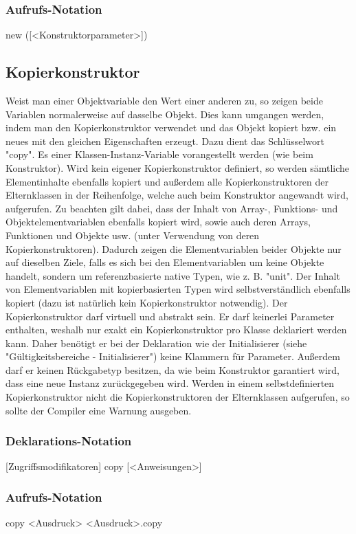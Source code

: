 \subsubsection{Aufrufs-Notation}
new ([<Konstruktorparameter>])

\subsection{Kopierkonstruktor}
Weist man einer Objektvariable den Wert einer anderen zu, so zeigen beide Variablen normalerweise auf dasselbe Objekt.
Dies kann umgangen werden, indem man den Kopierkonstruktor verwendet und das Objekt kopiert bzw. ein neues mit den gleichen
Eigenschaften erzeugt.
Dazu dient das Schlüsselwort "copy". Es einer Klassen-Instanz-Variable vorangestellt werden (wie beim Konstruktor).
Wird kein eigener Kopierkonstruktor definiert, so werden sämtliche Elementinhalte ebenfalls kopiert und außerdem
alle Kopierkonstruktoren der Elternklassen in der Reihenfolge, welche auch beim Konstruktor angewandt wird, aufgerufen.
Zu beachten gilt dabei, dass der Inhalt von Array-, Funktions- und Objektelementvariablen ebenfalls kopiert wird, sowie auch deren
Arrays, Funktionen und Objekte usw. (unter Verwendung von deren Kopierkonstruktoren). Dadurch zeigen die Elementvariablen beider Objekte nur auf
dieselben Ziele, falls es sich bei den Elementvariablen um keine Objekte handelt, sondern um referenzbasierte native Typen, wie z. B. "unit".
Der Inhalt von Elementvariablen mit kopierbasierten Typen wird selbstverständlich ebenfalls kopiert (dazu ist natürlich kein Kopierkonstruktor notwendig).
Der Kopierkonstruktor darf virtuell und abstrakt sein.
Er darf keinerlei Parameter enthalten, weshalb nur exakt ein Kopierkonstruktor pro Klasse deklariert werden kann.
Daher benötigt er bei der Deklaration wie der Initialisierer (siehe "Gültigkeitsbereiche - Initialisierer") keine Klammern für Parameter.
Außerdem darf er keinen Rückgabetyp besitzen, da wie beim Konstruktor garantiert wird, dass eine neue Instanz zurückgegeben wird.
Werden in einem selbstdefinierten Kopierkonstruktor nicht die Kopierkonstruktoren der Elternklassen aufgerufen, so sollte der Compiler eine Warnung ausgeben.

\subsubsection{Deklarations-Notation}
[Zugriffsmodifikatoren] copy
	[<Anweisungen>]

\subsubsection{Aufrufs-Notation}
copy <Ausdruck>
<Ausdruck>.copy

